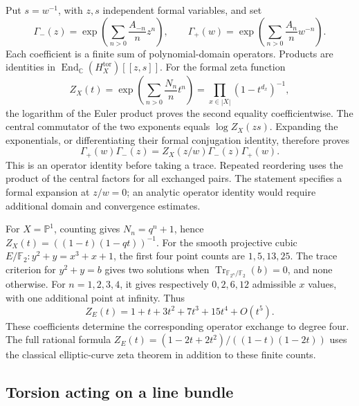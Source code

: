 Put $s=w^{-1}$, with $z,s$ independent formal variables, and set
\[
 \Gamma_-(z)=\exp\left(\sum_{n>0}\frac{A_{-n}}n z^n\right),\qquad
 \Gamma_+(w)=\exp\left(\sum_{n>0}\frac{A_n}n w^{-n}\right).
\]
Each coefficient is a finite sum of polynomial-domain operators.
Products are identities in
$\operatorname{End}_{\mathbb C}(H_X^{\mathrm{tor}})[[z,s]]$.
For the formal zeta function
\[
 Z_X(t)=\exp\left(\sum_{n>0}\frac{N_n}n t^n\right)
       =\prod_{x\in|X|}(1-t^{d_x})^{-1},
\]
the logarithm of the Euler product proves the second equality coefficientwise.
The central commutator of the two exponents equals $\log Z_X(zs)$.
Expanding the exponentials, or differentiating their formal conjugation
identity, therefore proves
\[
 \Gamma_+(w)\Gamma_-(z)
 =Z_X(z/w)\Gamma_-(z)\Gamma_+(w).
\]
This is an operator identity before taking a trace. Repeated reordering
uses the product of the central factors for all exchanged pairs.
The statement specifies a formal expansion at $z/w=0$; an analytic
operator identity would require additional domain and convergence estimates.

For $X=\mathbb P^1$, counting gives $N_n=q^n+1$, hence
$Z_X(t)=((1-t)(1-qt))^{-1}$.
For the smooth projective cubic
$E/\mathbb F_2: y^2+y=x^3+x+1$, the first four point counts are
$1,5,13,25$. The trace criterion for $y^2+y=b$ gives two solutions
when $\operatorname{Tr}_{\mathbb F_{2^n}/\mathbb F_2}(b)=0$, and none otherwise.
For $n=1,2,3,4$, it gives respectively $0,2,6,12$ admissible $x$ values,
with one additional point at infinity. Thus
\[
 Z_E(t)=1+t+3t^2+7t^3+15t^4+O(t^5).
\]
These coefficients determine the corresponding operator exchange to degree four.
The full rational formula
$Z_E(t)=(1-2t+2t^2)/((1-t)(1-2t))$
uses the classical elliptic-curve zeta theorem in addition to these finite counts.

\subsection{Torsion acting on a line bundle}

